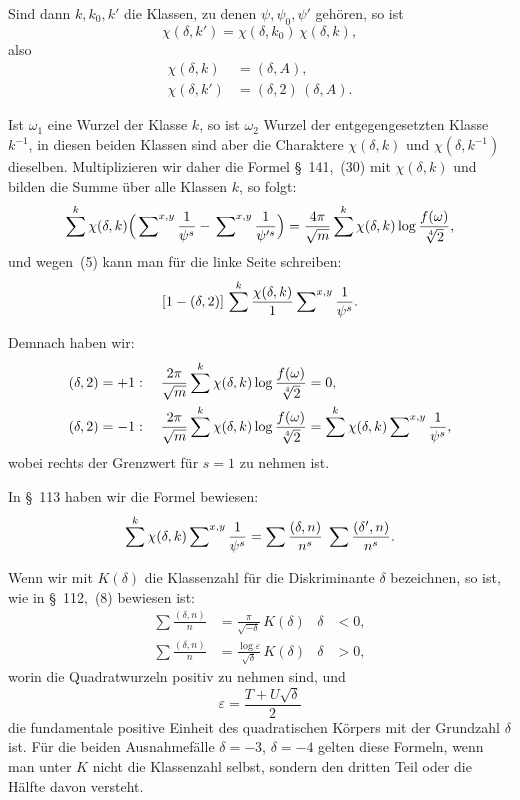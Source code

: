 \documentclass[12pt,a4paper]{article}
\theoremstyle{definition}
\begin{document}
Sind dann $k, k_{0}, k'$ die Klassen, zu denen $\psi, \psi_{0}, \psi'$ 
gehören, so ist
\[
\chi(\delta, k') = \chi(\delta, k_{0})\,\chi(\delta, k),
\]
also
\begin{equation}
\begin{aligned}
\chi(\delta, k) &= (\delta, A),\\
\chi(\delta, k') &= (\delta, 2)\,(\delta, A).
\end{aligned}
\end{equation}

Ist $\omega_{1}$ eine Wurzel der Klasse $k$, so ist $\omega_{2}$ Wurzel der 
entgegengesetzten Klasse $k^{-1}$, in diesen beiden Klassen sind aber die 
Charaktere $\chi(\delta, k)$ und $\chi(\delta, k^{-1})$ dieselben. 
Multiplizieren wir daher die Formel \S~141,~(30) mit $\chi(\delta, k)$ und 
bilden die Summe über alle Klassen $k$, so folgt:
\begin{equation}
\sum^{k}\chi(\delta, k)\Bigl(
\sideset{}{^{x,y}}\sum\frac{1}{\psi^{s}} -
\sideset{}{^{x,y}}\sum\frac{1}{\psi'^{s}}\Bigr) =
\frac{4\pi}{\sqrt{m}} \sum^{k}\chi(\delta, k)
\log\frac{f(\omega)}{\sqrt[4]{2}},
\end{equation}
und wegen~(5) kann man für die linke Seite schreiben:
\[
[1 - (\delta, 2)]\,\sum^{k}\frac{\chi(\delta, k)}{1}
\sideset{}{^{x,y}}\sum\frac{1}{\psi^{s}}.
\]

Demnach haben wir:
\begin{equation}
\begin{aligned}
(\delta, 2) = +1:\quad
\frac{2\pi}{\sqrt{m}}\sum^{k}\chi(\delta, k)
\log\frac{f(\omega)}{\sqrt[4]{2}} &= 0,\\
(\delta, 2) = -1:\quad
\frac{2\pi}{\sqrt{m}}\sum^{k}\chi(\delta, k)
\log\frac{f(\omega)}{\sqrt[4]{2}} &=
\sum^{k}\chi(\delta, k)\sideset{}{^{x,y}}\sum\frac{1}{\psi^{s}},
\end{aligned}
\end{equation}
wobei rechts der Grenzwert für $s = 1$ zu nehmen ist.

In \S~113 haben wir die Formel bewiesen:
\begin{equation}
\sum^{k}\chi(\delta, k)\sideset{}{^{x,y}}\sum\frac{1}{\psi^{s}} =
\sum\frac{(\delta, n)}{n^{s}}\;
\sum\frac{(\delta', n)}{n^{s}}.
\end{equation}

Wenn wir mit $K(\delta)$ die Klassenzahl für die Diskriminante $\delta$ 
bezeichnen, so ist, wie in \S~112,~(8) bewiesen ist:
\begin{equation}
\begin{aligned}
\sum\frac{(\delta, n)}{n} &= \frac{\pi}{\sqrt{-\delta}}\,K(\delta)
&\delta &< 0,\\
\sum\frac{(\delta, n)}{n} &= \frac{\log\varepsilon}{\sqrt{\delta}}\,K(\delta)
&\delta &> 0,
\end{aligned}
\end{equation}
worin die Quadratwurzeln positiv zu nehmen sind, und
\[
\varepsilon = \frac{T + U\sqrt{\delta}}{2}
\]
die fundamentale positive Einheit des quadratischen Körpers mit der 
Grundzahl $\delta$ ist. Für die beiden Ausnahmefälle $\delta = -3$, 
$\delta = -4$ gelten diese Formeln, wenn man unter $K$ nicht die 
Klassenzahl selbst, sondern den dritten Teil oder die Hälfte davon 
versteht.
\end{document}
